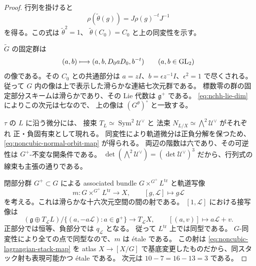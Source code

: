 \begin{proof}
行列を掛けると
\[
 \rho(\widetilde\theta(g))
       =J\rho(g)^{-t}J^{-1}
\]
を得る。この式は $\widetilde\theta^2=1$、
$\widetilde\theta(C_0)=C_0$ と上の同変性を示す。

$\widetilde G$ の固定群は
\[
 (a,b)\longmapsto(a,b,D_0aD_0,b^{-t})
 \qquad(a,b\in\operatorname{GL}_2)
\]
の像である。その $C_0$ との共通部分は
$a=zI$、$b=\epsilon z^{-1}I$、$\epsilon^2=1$ で尽くされる。
従って $G$ 内の像は上で表示した滑らかな連結七次元群である。
標数零の群の固定部分スキームは滑らかであり、その Lie 代数は
$\mathfrak g^+$ である。
\eqref{eq:nchh-lie-dim} によりこの次元は七なので、
上の像は $(G^\theta)^\circ$ と一致する。

$\tau$ の $L$ に沿う微分には、
接束 $T_L\simeq\operatorname{Sym}^2\mathscr U^\vee$ と
法束 $N_{L/X}\simeq\bigwedge^2\mathscr U^\vee$ がそれぞれ
正・負固有束として現れる。
同変性により軌道微分は正負分解を保つため、
\eqref{eq:noncubic-normal-orbit-map} が得られる。
両辺の階数は六であり、その可逆性は $G^+$-不変な開条件である。
$\det(\bigwedge^2\mathscr U^\vee)
=(\det\mathscr U^\vee)^3$ だから、行列式の線束も主張の通りである。

閉部分群 $G^+\subset G$ による associated bundle
$G\times^{G^+}L^{\mathrm{tr}}$ と軌道写像
\[
 m:G\times^{G^+}L^{\mathrm{tr}}\longrightarrow X,
 \qquad[g,\mathscr L]\longmapsto g\mathscr L
\]
を考える。これは滑らかな十六次元空間の間の射である。
$[1,\mathscr L]$ における接写像は
\[
 (\mathfrak g\oplus T_{\mathscr L}L)\big/
 \{(a,-a\mathscr L):a\in\mathfrak g^+\}
 \longrightarrow T_{\mathscr L}X,
 \qquad[(a,v)]\longmapsto a\mathscr L+v.
\]
正部分では恒等、負部分では $q_{\mathscr L}$ となる。
従って $L^{\mathrm{tr}}$ 上では同型である。
$G$-同変性により全ての点で同型なので、$m$ は \texorpdfstring{\'etale}{etale} である。
この射は \eqref{eq:noncubic-lagrangian-stack-map} を atlas $X\to[X/G]$
で基底変更したものだから、同スタック射も表現可能かつ
\texorpdfstring{\'etale}{etale} である。
次元は $10-7=16-13=3$ である。


\end{proof}
